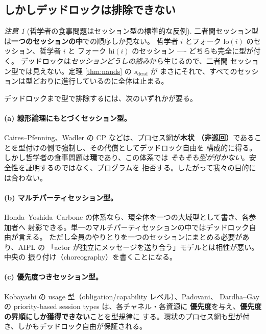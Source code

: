 \documentclass[11pt,a4paper]{ltjsarticle}
\theoremstyle{definition}
\theoremstyle{remark}
\newtheorem{remark}[theorem]{注意}
\begin{document}
\subsection{しかしデッドロックは排除できない}

\begin{remark}[哲学者の食事問題はセッション型の標準的な反例]
二者間セッション型は\textbf{一つのセッションの中}での順序しか見ない。
哲学者 $i$ とフォーク $\mathrm{lo}(i)$ のセッション、哲学者 $i$ と
フォーク $\mathrm{hi}(i)$ のセッション ---- どちらも完全に型が付く。
デッドロックは\emph{セッションどうしの絡み}から生じるので、二者間
セッション型では見えない。定理 \ref{thm:nands} の $s_{\mathrm{dead}}$ が
まさにそれで、すべてのセッションは型どおりに進行しているのに全体は止まる。
\end{remark}

デッドロックまで型で排除するには、次のいずれかが要る。

\paragraph{(a) 線形論理にもとづくセッション型。}
Caires--Pfenning、Wadler の \textsf{CP} などは、プロセス網が\textbf{木状
（非巡回）}であることを型付けの側で強制し、その代償としてデッドロック自由を
構成的に得る。しかし哲学者の食事問題は\textbf{環}であり、この体系では
\emph{そもそも型が付かない}。安全性を証明するのではなく、プログラムを
拒否する。したがって我々の目的には合わない。

\paragraph{(b) マルチパーティセッション型。}
Honda--Yoshida--Carbone の体系なら、環全体を一つの大域型として書き、各参加者へ
射影できる。単一のマルチパーティセッションの中ではデッドロック自由が言える。
ただし全員のやりとりを一つのセッションにまとめる必要があり、AIPL の
「actor が独立にメッセージを送り合う」モデルとは相性が悪い。中央の
振り付け（choreography）を書くことになる。

\paragraph{(c) 優先度つきセッション型。}
Kobayashi の usage 型（obligation/capability レベル）、Padovani、
Dardha--Gay の priority-based session types は、各チャネル・各資源に
\textbf{優先度}を与え、\textbf{優先度の昇順にしか獲得できない}ことを型規律に
する。環状のプロセス網も型が付き、しかもデッドロック自由が保証される。
\end{document}
